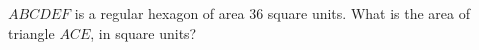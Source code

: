 $ABCDEF$ is a regular hexagon of area $36$ square units. What is the area of triangle $ACE$, in square units?
